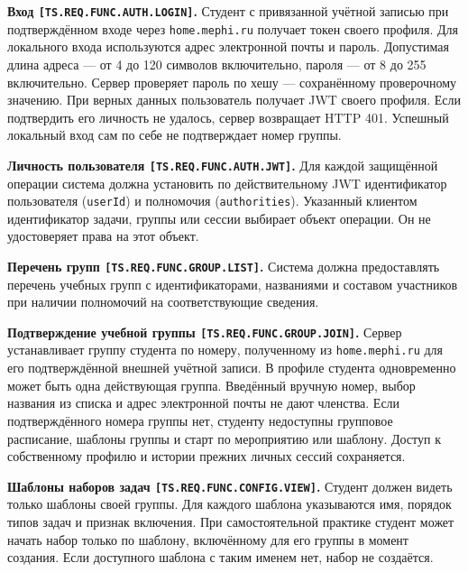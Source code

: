 \documentclass[12pt,a4paper]{article}
\begin{document}
\hypertarget{ts-req-func-auth-login}{} \textbf{Вход \texttt{[TS.\allowbreak{}REQ.\allowbreak{}FUNC.\allowbreak{}AUTH.\allowbreak{}LOGIN]}.} Студент с привязанной учётной записью при подтверждённом входе через \texttt{home.\allowbreak{}mephi.\allowbreak{}ru} получает токен своего профиля. Для локального входа используются адрес электронной почты и пароль. Допустимая длина адреса --- от 4 до 120 символов включительно, пароля --- от 8 до 255 включительно. Сервер проверяет пароль по хешу --- сохранённому проверочному значению. При верных данных пользователь получает JWT своего профиля. Если подтвердить его личность не удалось, сервер возвращает HTTP 401. Успешный локальный вход сам по себе не подтверждает номер группы.

\hypertarget{ts-req-func-auth-jwt}{} \textbf{Личность пользователя \texttt{[TS.\allowbreak{}REQ.\allowbreak{}FUNC.\allowbreak{}AUTH.\allowbreak{}JWT]}.} Для каждой защищённой операции система должна установить по действительному JWT идентификатор пользователя (\texttt{userId}) и полномочия (\texttt{authorities}). Указанный клиентом идентификатор задачи, группы или сессии выбирает объект операции. Он не удостоверяет права на этот объект.

\hypertarget{ts-req-func-group-list}{} \textbf{Перечень групп \texttt{[TS.\allowbreak{}REQ.\allowbreak{}FUNC.\allowbreak{}GROUP.\allowbreak{}LIST]}.} Система должна предоставлять перечень учебных групп с идентификаторами, названиями и составом участников при наличии полномочий на соответствующие сведения.

\hypertarget{ts-req-func-group-join}{} \textbf{Подтверждение учебной группы \texttt{[TS.\allowbreak{}REQ.\allowbreak{}FUNC.\allowbreak{}GROUP.\allowbreak{}JOIN]}.} Сервер устанавливает группу студента по номеру, полученному из \texttt{home.\allowbreak{}mephi.\allowbreak{}ru} для его подтверждённой внешней учётной записи. В профиле студента одновременно может быть одна действующая группа. Введённый вручную номер, выбор названия из списка и адрес электронной почты не дают членства. Если подтверждённого номера группы нет, студенту недоступны групповое расписание, шаблоны группы и старт по мероприятию или шаблону. Доступ к собственному профилю и истории прежних личных сессий сохраняется.

\hypertarget{ts-req-func-config-view}{} \textbf{Шаблоны наборов задач \texttt{[TS.\allowbreak{}REQ.\allowbreak{}FUNC.\allowbreak{}CONFIG.\allowbreak{}VIEW]}.} Студент должен видеть только шаблоны своей группы. Для каждого шаблона указываются имя, порядок типов задач и признак включения. При самостоятельной практике студент может начать набор только по шаблону, включённому для его группы в момент создания. Если доступного шаблона с таким именем нет, набор не создаётся.
\end{document}
